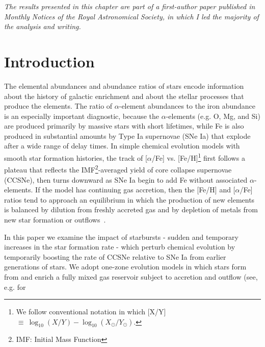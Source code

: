 
\begin{center}
\textit{
	The results presented in this chapter are part of a first-author paper
	published in Monthly Notices of the Royal Astronomical Society, in which I
	led the majority of the analysis and writing.
}
\end{center}

\section{Introduction}
\label{bursts:sec:intro}
The elemental abundances and abundance ratios of stars encode information 
about the history of galactic enrichment and about the stellar processes that 
produce the elements. The ratio of $\alpha$-element abundances to the iron 
abundance is an especially important diagnostic, because the $\alpha$-elements 
(e.g. O, Mg, and Si) are produced primarily by massive stars with short 
lifetimes, while Fe is also produced in substantial amounts by Type Ia 
supernovae (SNe Ia) that explode after a wide range of delay times. In simple 
chemical evolution models with smooth star formation histories, the track of 
[$\alpha$/Fe] vs. [Fe/H]\footnote{
	We follow conventional notation in which [X/Y] $\equiv\ \log_{10}(X/Y) 
	- \log_{10}(X_\odot/Y_\odot)$.  
} first follows a plateau that reflects the IMF\footnote{
	IMF: Initial Mass Function 
}-averaged yield of core collapse supernovae (CCSNe), then turns downward as 
SNe Ia begin to add Fe without associated $\alpha$-elements. If the model has 
continuing gas accretion, then the [Fe/H] and [$\alpha$/Fe] ratios tend to 
approach an equilibrium in which the production of new elements is balanced by 
dilution from freshly accreted gas and by depletion of metals from new star 
formation or outflows~\citep{Larson1972, Finlator2008, Andrews2017,
Weinberg2017b}.
\par\null\par\null\par 
In this paper we examine the impact of starbursts - sudden and temporary 
increases in the star formation rate - which perturb chemical evolution by 
temporarily boosting the rate of CCSNe relative to SNe Ia from earlier 
generations of stars. We adopt one-zone evolution models in which stars form 
from and enrich a fully mixed gas reservoir subject to accretion and outflow
(see, e.g. \citealp{Schmidt1959, Schmidt1963, Larson1972, Tinsley1980} for 
